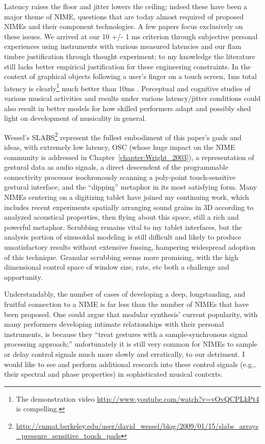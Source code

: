 Latency raises the floor and jitter lowers the ceiling; indeed these have been a major theme of NIME, questions that are today almost required of proposed NIMEs and their component technologies.  A few papers focus exclusively on these issues.  We arrived at our 10 +/- 1 ms criterion through subjective personal experiences using instruments with various measured latencies and our flam timbre justification through thought experiment; to my knowledge the literature still lacks better empirical justification for these engineering constraints.  In the context of graphical objects following a user's finger on a touch screen, 1ms total latency is clearly\footnote{The demonstration video \url{http://www.youtube.com/watch?v=vOvQCPLkPt4} is compelling.} much better than 10ms \cite{Jota:2013}. Perceptual and cognitive studies of various musical activities and results under various latency/jitter conditions could also result in better models for how skilled performers adapt and possibly shed light on development of musicality in general.

Wessel's SLABS\footnote{\url{http://cnmat.berkeley.edu/user/david_wessel/blog/2009/01/15/slabs_arrays_pressure_sensitive_touch_pads}} represent the fullest embodiment of this paper's goals and ideas, with extremely low latency, OSC (whose huge impact on the NIME community is addressed in Chapter~\ref{chapter:Wright_2003}), a representation of gestural data as audio signals, a direct descendent of the programmable connectivity processor isochronously scanning a poly-point touch-sensitive gestural interface, and the ``dipping'' metaphor in its most satisfying form.  Many NIMEs centering on a digitizing tablet \cite{Zbyszynski:2007} have joined my continuing work, which includes recent experiments spatially arranging sound grains in 3D according to analyzed acoustical properties, then flying about this space, still a rich and powerful metaphor.  Scrubbing remains vital to my tablet interfaces, but the analysis portion of sinusoidal modeling is still difficult and likely to produce unsatisfactory results without extensive fussing, hampering widespread adoption of this technique.   Granular scrubbing seems more promising, with the high dimensional control space of window size, rate, etc both a challenge and opportunity. 

Understandably, the number of cases of developing a deep, longstanding, and fruitful connection to a NIME is far less than the number of NIMEs that have been proposed.  One could argue that modular synthesis' current popularity, with many performers developing intimate relationships with their personal instruments, is because they ``treat gestures with a sample-synchronous signal processing approach;'' unfortunately it is still very common for NIMEs to sample or delay control signals much more slowly and erratically, to our detriment.  I would like to see and perform additional research into these control signals (e.g., their spectral and phase properties) in sophisticated musical contexts.



